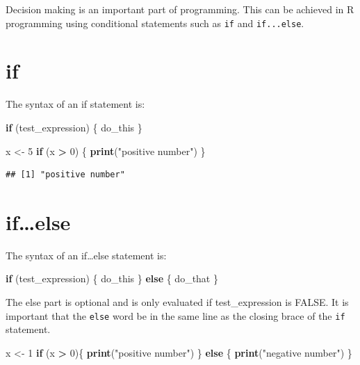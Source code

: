 \documentclass[
]{book}
\newenvironment{Shaded}{\begin{snugshade}}{\end{snugshade}}
\newcommand{\ControlFlowTok}[1]{\textcolor[rgb]{0.13,0.29,0.53}{\textbf{#1}}}
\newcommand{\DecValTok}[1]{\textcolor[rgb]{0.00,0.00,0.81}{#1}}
\newcommand{\KeywordTok}[1]{\textcolor[rgb]{0.13,0.29,0.53}{\textbf{#1}}}
\newcommand{\NormalTok}[1]{#1}
\newcommand{\OperatorTok}[1]{\textcolor[rgb]{0.81,0.36,0.00}{\textbf{#1}}}
\newcommand{\StringTok}[1]{\textcolor[rgb]{0.31,0.60,0.02}{#1}}
\begin{document}
Decision making is an important part of programming. This can be achieved in R programming using conditional statements such as \texttt{if} and \texttt{if...else}.

\hypertarget{if}{%
\section{if}\label{if}}

The syntax of an if statement is:

\begin{Shaded}
\begin{Highlighting}[]
\ControlFlowTok{if}\NormalTok{ (test_expression) \{}
\NormalTok{  do_this}
\NormalTok{\}}
\end{Highlighting}
\end{Shaded}

\begin{Shaded}
\begin{Highlighting}[]
\NormalTok{x <-}\StringTok{ }\DecValTok{5}
\ControlFlowTok{if}\NormalTok{ (x }\OperatorTok{>}\StringTok{ }\DecValTok{0}\NormalTok{) \{}
  \KeywordTok{print}\NormalTok{(}\StringTok{"positive number"}\NormalTok{)}
\NormalTok{\}}
\end{Highlighting}
\end{Shaded}

\begin{verbatim}
## [1] "positive number"
\end{verbatim}

\hypertarget{ifelse}{%
\section{if\ldots else}\label{ifelse}}

The syntax of an if\ldots else statement is:

\begin{Shaded}
\begin{Highlighting}[]
\ControlFlowTok{if}\NormalTok{ (test_expression) \{}
\NormalTok{  do_this}
\NormalTok{\} }\ControlFlowTok{else}\NormalTok{ \{}
\NormalTok{    do_that}
\NormalTok{\}}
\end{Highlighting}
\end{Shaded}

The else part is optional and is only evaluated if test\_expression is FALSE. It is important that the \texttt{else} word be in the same line as the closing brace of the \texttt{if} statement.

\begin{Shaded}
\begin{Highlighting}[]
\NormalTok{x <-}\StringTok{ }\DecValTok{1}
\ControlFlowTok{if}\NormalTok{ (x }\OperatorTok{>}\StringTok{ }\DecValTok{0}\NormalTok{)\{}
  \KeywordTok{print}\NormalTok{(}\StringTok{"positive number"}\NormalTok{)}
\NormalTok{\} }\ControlFlowTok{else}\NormalTok{ \{}
    \KeywordTok{print}\NormalTok{(}\StringTok{"negative number"}\NormalTok{)}
\NormalTok{\}}
\end{Highlighting}
\end{Shaded}
\end{document}
